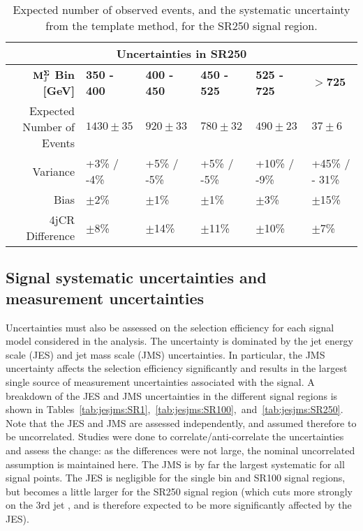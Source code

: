 \begin{table}[!ht]
\begin{center}\renewcommand\arraystretch{1.6}
\begin{tabular}{r|l |l |l |l |l }

  
\multicolumn{6}{c}{Uncertainties in SR250} \\
\hline \hline

$\mathbf{M_{\textrm{J}}^{\Sigma}}$ \textbf{Bin [GeV]}  & \textbf{350 - 400} & \textbf{400 - 450} & \textbf{450 - 525} & \textbf{525 - 725} & $\mathbf{>725}$ \\ \cline{2-6}
\hline
 Expected Number of Events & $1430\pm35$ & $920\pm33$ & $780\pm32$ & $490\pm23$ & $37\pm6$ \\
 Variance & +3\% / -4\% & +5\% / -5\% & +5\% / -5\% & +10\% / -9\% & +45\% / - 31\% \\
 Bias & $\pm$2\% & $\pm$1\% & $\pm$1\% & $\pm$3\% & $\pm$15\% \\
 4jCR Difference & $\pm$8\% & $\pm$14\% & $\pm$11\% & $\pm$10\% & $\pm$7\% \\
 \hline \hline
  \end{tabular}
  
  \caption{Expected number of observed events, and the systematic uncertainty from the template method, for the SR250 signal region. \label{tab:backSR250}}
\end{center}
\end{table}





\subsection{Signal systematic uncertainties and measurement uncertainties}

Uncertainties must also be assessed on the selection efficiency for each signal model considered in the analysis. The uncertainty is dominated by the jet energy scale (JES) and jet mass scale (JMS) uncertainties. In particular, the JMS uncertainty affects the selection efficiency significantly and results in the largest single source of measurement uncertainties associated with the signal. A breakdown of the JES and JMS uncertainties in the different signal regions is shown in Tables~\ref{tab:jesjms:SR1},~\ref{tab:jesjms:SR100},~and~\ref{tab:jesjms:SR250}. 
%
Note that the JES and JMS are assessed independently, and assumed therefore to be uncorrelated. Studies were done to correlate/anti-correlate the uncertainties and assess the change: as the differences were not large, the nominal uncorrelated assumption is maintained here.
%
The JMS is by far the largest systematic for all signal points. The JES is negligible for the single bin and SR100 signal regions, but becomes a little larger for the SR250 signal region (which cuts more strongly on the 3rd jet \pT, and is therefore expected to be more significantly affected by the JES).

